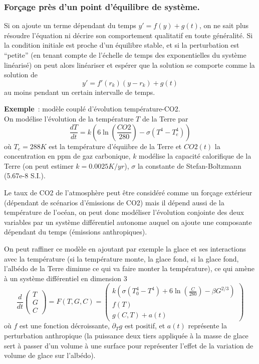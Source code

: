\documentclass[a4paper,11pt]{article}
\begin{document}
\begin{giacjshere}
\subsubsection{For\c{c}age pr\`es d'un point d'\'equilibre de syst\`eme.}
Si on ajoute un terme d\'ependant du temps $y'=f(y)+g(t)$,
on ne sait plus r\'esoudre l'\'equation ni d\'ecrire
son comportement qualitatif en toute g\'en\'eralit\'e. Si
la condition initiale est proche d'un \'equilibre stable, et si
la perturbation est ``petite'' (en tenant compte de l'\'echelle
de temps des exponentielles du syst\`eme lin\'earis\'e)
on peut alors lin\'eariser et esp\'erer que
la solution se comporte comme la solution de
$$y'=f'(r_k)(y-r_k) + g(t)$$
au moins pendant un certain intervalle de temps.

{\bf Exemple}~: mod\`ele coupl\'e d'\'evolution temp\'erature-CO2.\\
On mod\'elise l'\'evolution de la temp\'erature
$T$ de la Terre par
\[ \frac{dT}{dt} = k \left( 6 \ln (\frac{CO2}{280}) - \sigma (T^4-T_e^4) \right)\]
o\`u $T_e=288K$ est la temp\'erature d'\'equiibre de la Terre et 
$CO2(t)$ la concentration en ppm de gaz carbonique, $k$ mod\'elise
la capacit\'e calorifique de la Terre (on peut estimer $k=0.0025K/yr$),
$\sigma$ la constante de Stefan-Boltzmann (5.67e-8 S.I.).

Le taux de CO2 de l'atmosph\`ere peut \^etre consid\'er\'e comme
un for\c{c}age ext\'erieur (d\'ependant de sc\'enarios d'\'emissions
de CO2) mais il d\'epend aussi de la temp\'erature de l'oc\'ean,
on peut donc mod\'eliser l'\'evolution conjointe des deux
variables par un syst\`eme diff\'erentiel autonome auquel on
ajoute une composante d\'ependant du temps (\'emissions
anthropiques).

On peut raffiner ce mod\`ele en ajoutant par exemple la glace
et ses interactions avec la temp\'erature (si la temp\'erature
monte, la glace fond, si la glace fond, l'alb\'edo de la Terre diminue
ce qui va faire monter la temp\'erature), ce qui am\`ene \`a un
syst\`eme diff\'erentiel en dimension 3
\[ \frac{d}{dt} \left(\begin{array}{c}
T \\
G \\
C
\end{array}\right) =
F(T,G,C) = \left(\begin{array}{c}
k (\sigma(T_0^4-T^4)+6 \ln(\frac{C}{280}) - \beta G^{2/3} ) \\
f(T) \\
g(C,T) + a(t)
\end{array}\right)
\]
o\`u $f$ est une fonction d\'ecroissante, $\partial_T g$ est positif,
et $a(t)$ repr\'esente la perturbation anthropique (la puissance deux
tiers appliqu\'ee \`a la masse de glace sert \`a passer d'un volume
\`a une surface pour repr\'esenter l'effet de la variation de volume
de glace sur l'alb\'edo).



\end{giacjshere}
\end{document}
